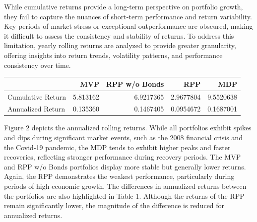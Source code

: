 \documentclass[11pt,preprint]{elsarticle}
\let\origtable\table
\let\endorigtable\endtable
\renewenvironment{table}[1][2] {
    \expandafter\origtable\expandafter[H]
} {
    \endorigtable
}
\numberwithin{equation}{section}
\numberwithin{figure}{section}
\numberwithin{table}{section}
\begin{document}
While cumulative returns provide a long-term perspective on portfolio
growth, they fail to capture the nuances of short-term performance and
return variability. Key periods of market stress or exceptional
outperformance are obscured, making it difficult to assess the
consistency and stability of returns. To address this limitation, yearly
rolling returns are analyzed to provide greater granularity, offering
insights into return trends, volatility patterns, and performance
consistency over time.

\begin{table}
\centering
\caption{\label{tab:returns}Cumulative and Annualized Returns}
\centering
\begin{tabular}[t]{l|r|r|r|r}
\hline
  & MVP & RPP w/o Bonds & RPP & MDP\\
\hline
Cumulative Return & 5.813162 & 6.9217365 & 2.9677804 & 9.5520638\\
\hline
Annualized Return & 0.135360 & 0.1467405 & 0.0954672 & 0.1687001\\
\hline
\end{tabular}
\end{table}

Figure 2 depicts the annualized rolling returns. While all portfolios
exhibit spikes and dips during significant market events, such as the
2008 financial crisis and the Covid-19 pandemic, the MDP tends to
exhibit higher peaks and faster recoveries, reflecting stronger
performance during recovery periods. The MVP and RPP w/o Bonds
portfolios display more stable but generally lower returns. Again, the
RPP demonstrates the weakest performance, particularly during periods of
high economic growth. The differences in annualized returns between the
portfolios are also highlighted in Table 1. Although the returns of the
RPP remain significantly lower, the magnitude of the difference is
reduced for annualized returns.
\end{document}
